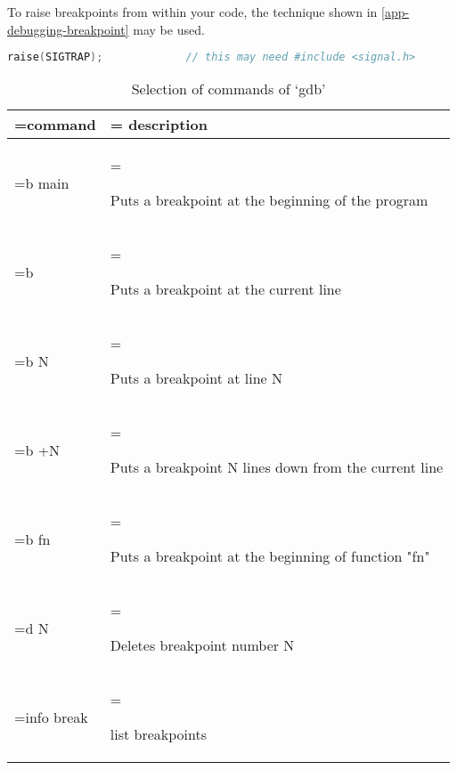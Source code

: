 To raise breakpoints from within your code, the technique shown in
\autoref{app-debugging-breakpoint} may be used.

\begin{lstlisting}[language=C++, caption={C++ code to create a breakpoint for debugging},label={app-debugging-breakpoint}]
raise(SIGTRAP);             // this may need #include <signal.h>
\end{lstlisting}

\begin{table}[htbp]
    \centering
    \caption{Selection of commands of ‘gdb’}
    \label{app-debugging-tab:gdb}
    \begin{tabularx}{\textwidth}{
            >{\hsize=0.20\hsize\linewidth=\hsize}X
            >{\hsize=0.80\hsize\linewidth=\hsize}X}
        \hline
        command          & description                                   \\

        \hline

        b main           &

        Puts a breakpoint at the beginning of the program                \\

        b                &

        Puts a breakpoint at the current line                            \\

        b N              &

        Puts a breakpoint at line N                                      \\

        b +N             &

        Puts a breakpoint N lines down from the current line             \\

        b fn             &

        Puts a breakpoint at the beginning of function "fn"              \\

        d N              &

        Deletes breakpoint number N                                      \\

        info break       &

        list breakpoints                                                 \\


\end{tabularx}
\end{table}
